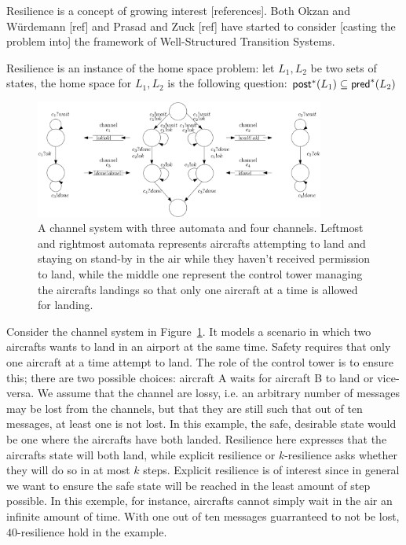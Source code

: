 Resilience is a concept of growing interest [references]. Both Okzan and Würdemann [ref] and Prasad and Zuck [ref] have started to consider [casting the problem into] the framework of Well-Structured Transition Systems. 
 
Resilience is an instance of the home space problem: let $L_1,L_2$ be two sets of states, the home space for  $L_1,L_2$ is the following question:		
	$\textsf{post}^*(L_1)	\subseteq \textsf{pred}^*(L_2)$


\begin{center}
	\begin{figure}
			\hspace{0.75cm}
\includegraphics[width=0.85\textwidth]{FigureB}
	\caption{A channel system with three automata and four channels. Leftmost and rightmost automata represents aircrafts attempting to land and staying on stand-by in the air while they haven't received permission to land, while the middle one represent the control tower managing the aircrafts landings so that only one aircraft at a time is allowed for landing.}
					\label{air control}
	\end{figure}
\end{center}

Consider the channel system in Figure~\ref{air control}. It models a scenario in which two aircrafts wants to land in an airport at the same time. Safety requires that only one aircraft at a time attempt to land. The role of the control tower is to ensure this;
there are two possible choices: aircraft A waits for aircraft B to land
or vice-versa. 
We assume that the channel are lossy, i.e. an arbitrary number of messages may be lost from the channels, but that they are still such that out of ten messages, at least one is not lost.
In this example, the safe, desirable state would be one where the aircrafts have both landed. 
Resilience here expresses that the aircrafts state will both land, while explicit resilience or $k$-resilience asks whether they will do so in at most $k$ steps. 
Explicit resilience is of interest since in general we want to ensure the safe state will
be reached in
the least amount of step possible. 
In this exemple, for instance, aircrafts cannot simply wait in the air an infinite amount of time.
With one out of ten messages guarranteed to not be lost, $40$-resilience hold in the example.

